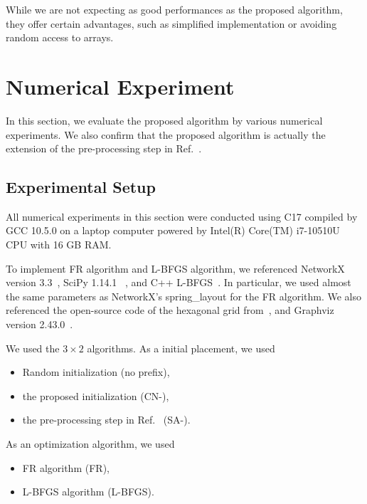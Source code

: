 \documentclass[dvipdfmx,10pt,journal,compsoc]{IEEEtran}
\newcommand{\Cpp}{C\nolinebreak[4]\hspace{-.05em}\raisebox{.4ex}{\relsize{-3}{\textbf{++}}}}
\begin{document}
While we are not expecting as good performances as the proposed algorithm, they offer certain advantages, such as simplified implementation or avoiding random access to arrays.

\section{Numerical Experiment} \label{sec:experiment}

In this section, we evaluate the proposed algorithm by various numerical experiments.
We also confirm that the proposed algorithm is actually the extension of the pre-processing step in Ref.~\cite{ghassemitoosiSimulatedAnnealingPreProcessing2016}.

\subsection{Experimental Setup}\label{ssec:setup}

All numerical experiments in this section were conducted using \Cpp17 compiled by GCC 10.5.0 on a laptop computer powered by Intel(R) Core(TM) i7-10510U CPU with 16 GB RAM.

To implement FR algorithm and L-BFGS algorithm, we referenced NetworkX version 3.3~\cite{hagberg2008exploring}, SciPy 1.14.1 ~\cite{2020SciPy-NMeth}, and C++ L-BFGS~\cite{qiuYixuanLBFGSpp2024,okazakiChokkanLiblbfgs2024}. In particular, we used almost the same parameters as NetworkX's \textsf{spring\_layout} for the FR algorithm.
We also referenced the open-source code of the hexagonal grid from~\cite{patelHexagonalGrids2013}, and Graphviz version 2.43.0~\cite{ellsonGraphvizOpenSource2002}.

We used the $3 \times 2$ algorithms.
As a initial placement, we used
\begin{itemize}
  \item Random initialization (no prefix),
  \item the proposed initialization (\textsf{CN-}),
  \item the pre-processing step in Ref.~\cite{ghassemitoosiSimulatedAnnealingPreProcessing2016} (\textsf{SA-}).
\end{itemize}
As an optimization algorithm, we used
\begin{itemize}
  \item FR algorithm (\textsf{FR}),
  \item L-BFGS algorithm (\textsf{L-BFGS}).
\end{itemize}
\end{document}
